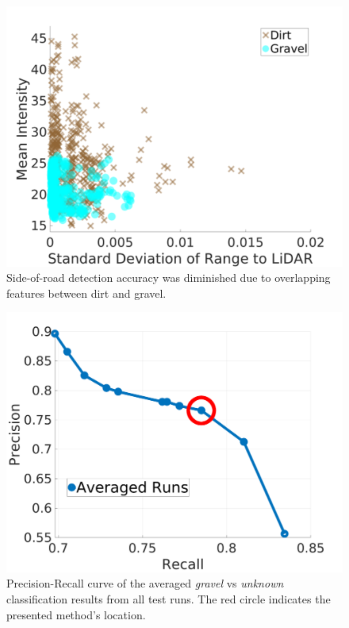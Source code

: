 \documentclass[journal,onecolumn]{IEEEtran}
\begin{document}
		\begin{figure}[H]
			\centering
			\includegraphics[width=0.75\linewidth]{figures/dirt_v_gravel_3}
			\caption[Re-grassed Dirt vs Gravel]{Side-of-road detection accuracy was diminished due to overlapping features between dirt and gravel. }
			\label{fig:dirt_v_gravel}
		\end{figure}
		
		
	
		\begin{figure}[H]
			\centering
			\includegraphics[width=0.75\linewidth]{figures/precision_recall_curve_averaged_marked}
			\caption[PR Curve]{Precision-Recall curve of the averaged \textit{gravel} vs \textit{unknown} classification results from all test runs. The red circle indicates the presented method's location.}
			\label{fig:precision_recall_curve_averaged}
		\end{figure}
		
\end{document}
